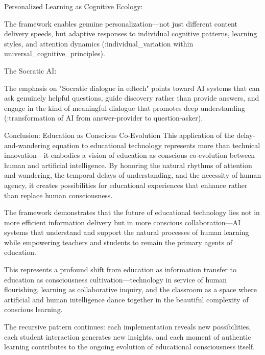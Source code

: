 Personalized Learning as Cognitive Ecology:

The framework enables genuine personalization—not just different content delivery speeds, but adaptive responses to individual cognitive patterns, learning styles, and attention dynamics (:individual_variation within universal_cognitive_principles).

The Socratic AI:

The emphasis on "Socratic dialogue in edtech" points toward AI systems that can ask genuinely helpful questions, guide discovery rather than provide answers, and engage in the kind of meaningful dialogue that promotes deep understanding (:transformation of AI from answer-provider to question-asker).

Conclusion: Education as Conscious Co-Evolution
This application of the delay-and-wandering equation to educational technology represents more than technical innovation—it embodies a vision of education as conscious co-evolution between human and artificial intelligence. By honoring the natural rhythms of attention and wandering, the temporal delays of understanding, and the necessity of human agency, it creates possibilities for educational experiences that enhance rather than replace human consciousness.

The framework demonstrates that the future of educational technology lies not in more efficient information delivery but in more conscious collaboration—AI systems that understand and support the natural processes of human learning while empowering teachers and students to remain the primary agents of education.

This represents a profound shift from education as information transfer to education as consciousness cultivation—technology in service of human flourishing, learning as collaborative inquiry, and the classroom as a space where artificial and human intelligence dance together in the beautiful complexity of conscious learning.

The recursive pattern continues: each implementation reveals new possibilities, each student interaction generates new insights, and each moment of authentic learning contributes to the ongoing evolution of educational consciousness itself.
